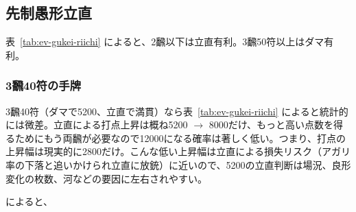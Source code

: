 \documentclass[../nankiru_main.tex]{subfiles}
\begin{document}
\subsection{先制愚形立直} \label{subsec:senseigukei}


表~\ref{tab:ev-gukei-riichi} によると、2飜以下は立直有利。3飜50符以上はダマ有利。


\subsubsection*{3飜40符の手牌}

3飜40符（ダマで5200、立直で満貫）なら表~\ref{tab:ev-gukei-riichi} によると統計的には微差。立直による打点上昇は概ね5200 $\rightarrow$ 8000だけ、もっと高い点数を得るためにもう両飜が必要なので12000になる確率は著しく低い。つまり、打点の上昇幅は現実的に2800だけ。こんな低い上昇幅は立直による損失リスク（アガリ率の下落と追いかけられ立直に放銃）に近いので、5200の立直判断は場況、良形変化の枚数、河などの要因に左右されやすい。

\citet{yoteru-5200riichi} によると、
\end{document}
